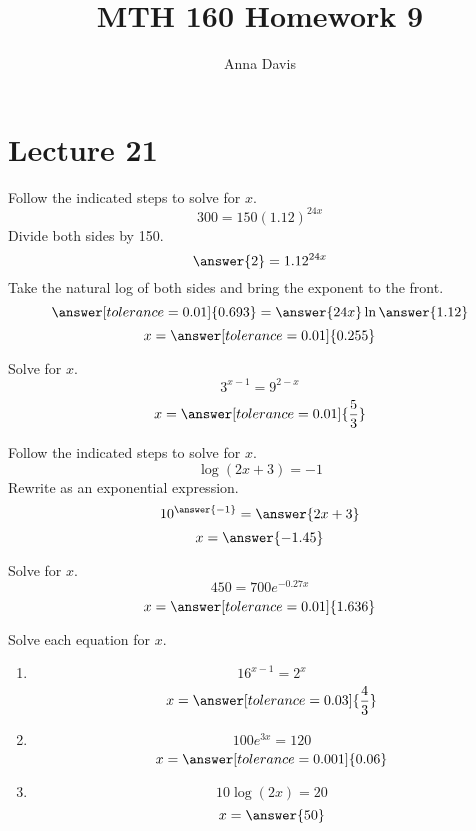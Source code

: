\documentclass{ximera}
\author{Anna Davis} \title{MTH 160 Homework 9}
\begin{document}
\begin{abstract}

\end{abstract}
\maketitle
 
  \section{Lecture 21}
 
 \begin{problem}\label{prob:160hom8prob4}
Follow the indicated steps to solve for $x$.
$$300=150(1.12)^{24x}$$
Divide both sides by 150.
$$\answer{2}=1.12^{24x}$$
Take the natural log of both sides and bring the exponent to the front.
$$\answer[tolerance=0.01]{0.693}=\answer{24x}\ln\answer{1.12}$$
$$x=\answer[tolerance=0.01]{0.255}$$
\end{problem}

\begin{problem}\label{prob:160hom8prob5}
Solve for $x$.
$$3^{x-1}=9^{2-x}$$
$$x=\answer[tolerance=0.01]{\frac{5}{3}}$$
\end{problem}

\begin{problem}\label{prob:160hom8prob6}
Follow the indicated steps to solve for $x$.
$$\log (2x+3)=-1$$
Rewrite as an exponential expression.
$$10^{\answer{-1}}=\answer{2x+3}$$
$$x=\answer{-1.45}$$
\end{problem}

\begin{problem}\label{prob:160hom8prob7}
Solve for $x$.
$$450=700e^{-0.27x}$$
$$x=\answer[tolerance=0.01]{1.636}$$
\end{problem}

\begin{problem}\label{prob:160hom8prob9}
 Solve each equation for $x$.
 \begin{enumerate}
     \item $$16^{x-1}=2^x$$
     $$x=\answer[tolerance=0.03]{\frac{4}{3}}$$
     \item 
     $$100e^{3x}=120$$
     $$x=\answer[tolerance=0.001]{0.06}$$
     \item 
     $$10\log (2x)=20$$
     $$x=\answer{50}$$
 \end{enumerate}
 \end{problem}
 
\end{document}

